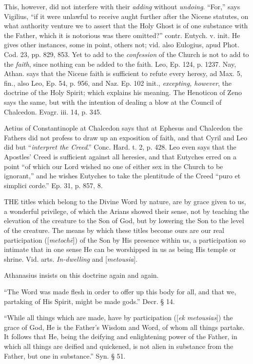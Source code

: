 This, however, did not interfere with their \emph{adding}
without \emph{undoing}.
``For,'' says Vigilius, ``if it were unlawful to receive aught
further after the Nicene statutes, on what authority venture we to
assert that the Holy Ghost is of one substance with the Father, which
it is notorious was there omitted?'' contr. Eutych. v. init. He gives
other instances, some in point, others not; vid. also Eulogius, apud
Phot. Cod. 23, pp. 829, 853. Yet to add to the \emph{confession} of the Church is not to add to the \emph{faith},
since nothing can be added to the faith. Leo, Ep. 124, p. 1237.
Nay, Athan. says that the Nicene faith is sufficient to refute every
heresy, ad Max. 5, fin., also Leo, Ep. 54, p. 956, and Naz. Ep. 102
init., \emph{excepting, however}, the doctrine of the Holy Spirit; which explains his meaning.
The Henoticon of Zeno says the same, but with the intention of dealing
a blow at the Council of Chalcedon. Evagr. iii. 14, p. 345.

Aetius of Constantinople at Chalcedon says that
at Ephesus and Chalcedon the Fathers did not profess to draw up an
exposition of faith, and that Cyril and Leo did but ``\emph{interpret
the Creed}.'' Conc. Hard. t. 2, p. 428. Leo even says that
the Apostles' Creed is sufficient against all heresies, and that
Eutyches erred on a point ``of which our Lord wished no one of either
sex in the Church to be ignorant,'' and he wishes Eutyches to take the
plentitude of the Creed ``puro et simplici corde.'' Ep. 31, p. 857, 8.


THE
titles which belong to the Divine Word by nature, are by grace given
to us, a wonderful privilege, of which the Arians showed their sense,
not by teaching the elevation of the creature to the Son of God, but
by lowering the Son to the level of the creature. The means by which
these titles become ours are our real participation ([\emph{metoch\={e}}])
of the Son by His presence within us, a participation so intimate that
in one sense He can be worshipped in us as being His temple or shrine.
Vid. arts. \emph{In-dwelling} and [\emph{metousia}].

Athanasius insists on this doctrine again and
again.

``The Word was made flesh in order to offer up
this body for all, and that we, partaking of His Spirit, might be made
gods.'' Decr. § 14.

``While all things which are made, have by
participation ([\emph{ek metousias}]) the grace of God, He is the
Father's Wisdom and Word, of whom all things partake. It follows that
He, being the deifying and enlightening power of the Father, in which
all things are deified and quickened, is not alien in substance from
the Father, but one in substance.'' Syn. § 51.

